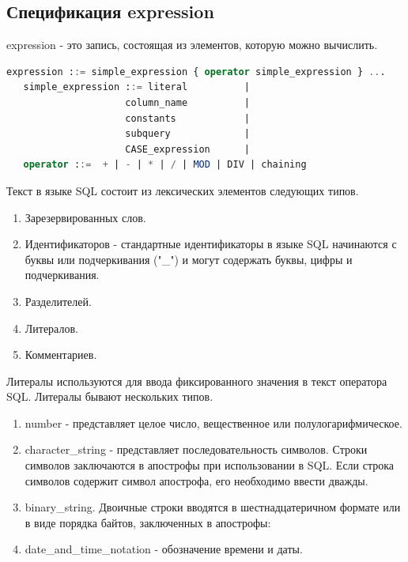 \subsection{Спецификация expression}

expression - это запись, состоящая из элементов, которую можно вычислить. 

\begin{lstlisting}[language=sql, label=some-code, caption=Спецификация SQL запроса]
   expression ::= simple_expression { operator simple_expression } ...
   simple_expression ::= literal          |
                     column_name          |
                     constants            |
                     subquery             |
                     CASE_expression      |
   operator ::=  + | - | * | / | MOD | DIV | chaining
\end{lstlisting}

Текст в языке SQL состоит из лексических элементов следующих типов.
\begin{enumerate}
   \item Зарезервированных слов.
   \item Идентификаторов - стандартные идентификаторы в языке SQL начинаются с буквы или подчеркивания ("\_") и могут содержать буквы, цифры и подчеркивания.
   \item Разделителей.
   \item Литералов.
   \item Комментариев.
\end{enumerate}

Литералы используются для ввода фиксированного значения в текст оператора SQL. 
Литералы бывают нескольких типов.

\begin{enumerate}
   \item number - представляет целое число, вещественное или полулогарифмическое.
   \item character\_string - представляет последовательность символов. Строки символов заключаются в апострофы при использовании в SQL. 
   Если строка символов содержит символ апострофа, его необходимо ввести дважды.
   \item binary\_string. Двоичные строки вводятся в шестнадцатеричном формате или в виде порядка байтов, заключенных в апострофы:
   \item date\_and\_time\_notation - обозначение времени и даты.  
\end{enumerate}

